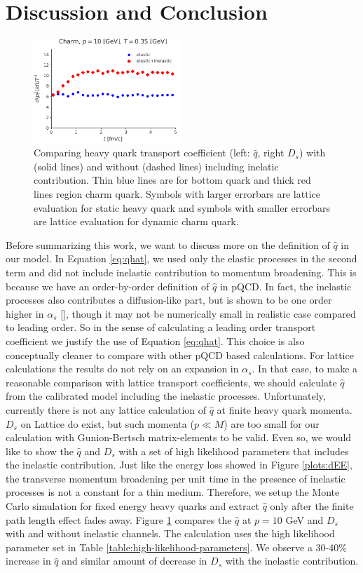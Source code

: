 \documentclass[aps, prc, reprint, amsmath, groupedaddress, nofootinbib]{revtex4-1}
\begin{document}
\section{Discussion and Conclusion}\label{section:conclusion}
\begin{figure}
\includegraphics[width=0.5\textwidth]{qhat_full.pdf}
\caption{Comparing heavy quark transport coefficient (left: $\hat{q}$, right $D_s$) with (solid lines) and without (dashed lines) including inelatic contribution. Thin blue lines are for bottom quark and thick red lines region charm quark. Symbols with larger errorbars are lattice evaluation for static heavy quark and symbols with smaller errorbars are lattice evaluation for dynamic charm quark.}\label{plots:transport_full}
\end{figure}
Before summarizing this work, we want to discuss more on the definition of $\hat{q}$ in our model.
In Equation \ref{eq:qhat}, we used only the elastic processes in the second term and did not include inelastic contribution to momentum broadening.
This is because we have an order-by-order definition of $\hat{q}$ in pQCD.
In fact, the inelastic processes also contributes a diffusion-like part, but is shown to be one order higher in $\alpha_s$ [], though it may not be numerically small in realistic case compared to leading order.
So in the sense of calculating a leading order transport coefficient we justify the use of Equation \ref{eq:qhat}. 
This choice is also conceptually cleaner to compare with other pQCD based calculations.
For lattice calculations the results do not rely on an expansion in $\alpha_s$.
In that case, to make a reasonable comparison with lattice transport coefficients, we should calculate $\hat{q}$ from the calibrated model including the inelastic processes.
Unfortunately, currently there is not any lattice calculation of $\hat{q}$ at finite heavy quark momenta.  
$D_s$ on Lattice do exist, but such momenta ($p \ll M$) are too small for our calculation with Gunion-Bertsch matrix-elements to be valid.
Even so, we would like to show the $\hat{q}$ and $D_s$ with a set of high likelihood parameters that includes the inelastic contribution.
Just like the energy loss showed in Figure \ref{plots:dEE}, the transverse momentum broadening per unit time in the presence of inelastic processes is not a constant for a thin medium.
Therefore, we setup the Monte Carlo simulation for fixed energy heavy quarks and extract $\hat{q}$ only after the finite path length effect fades away. 
Figure \ref{plots:transport_full} compares the $\hat{q}$ at $p=10$ GeV and $D_s$ with and without inelastic channels.
The calculation uses the high likelihood parameter set in Table \ref{table:high-likelihood-parameters}. 
We observe a 30-40\% increase in $\hat{q}$ and similar amount of decrease in $D_s$ with the inelastic contribution.
\end{document}
